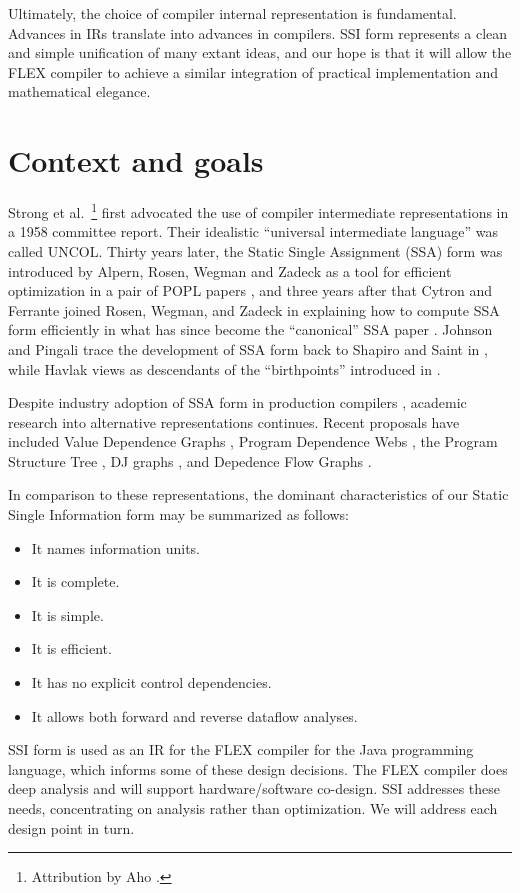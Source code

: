 \documentclass[12pt,titlepage,twoside]{article}
\let\oldsection\section
\renewcommand{\section}{\setcounter{figure}{0}\setcounter{table}{0}\oldsection}
\begin{document}
Ultimately, the choice of compiler internal representation is fundamental.
Advances in IRs translate into advances in compilers.  SSI form
represents a clean and simple unification of many extant ideas, and
our hope is that it will allow the FLEX compiler to achieve a similar
integration of practical implementation and mathematical elegance.

\section{Context and goals}
Strong et al.\ \cite{strong58}\footnote{Attribution by 
Aho \cite{aho88:dragon}.} first advocated the use of compiler
intermediate representations in a 1958 committee report.  Their
idealistic ``universal intermediate language'' was called UNCOL.
Thirty years later, the Static Single Assignment (SSA) form was
introduced by  Alpern, Rosen, Wegman and Zadeck
as a tool for efficient optimization in a pair of POPL
papers \cite{alpern88:ssa,rosen88:gvn}, and three years after that Cytron
and Ferrante joined Rosen, Wegman, and Zadeck in explaining how to
compute SSA form efficiently in what has since become the 
``canonical'' SSA paper \cite{cytron89:ssa}.  Johnson and Pingali
\cite{johnson93:dfg} trace the development of SSA form back to Shapiro
and Saint in \cite{shapiro70:ssa}, while Havlak \cite{havlak94:isa}
views  as descendants of the ``birthpoints'' introduced
in \cite{reif81:sym}.

Despite industry adoption of SSA form in production compilers
\cite{chow97:ssapre,chow96:hssa}, academic research into alternative
representations continues.
Recent proposals have included Value Dependence Graphs
\cite{weise94:vdg}, Program Dependence Webs \cite{ballance90:pdw},
the Program Structure Tree \cite{johnson94:pst},
DJ graphs \cite{sreedhar96:dj}, and Depedence Flow Graphs
\cite{johnson93:dfg}.

In comparison to these representations, the dominant characteristics of
our Static Single Information form may be summarized as follows:
\begin{itemize}
\item It names information units.
\item It is complete.
\item It is simple.
\item It is efficient.
\item It has no explicit control dependencies.
\item It allows both forward and reverse dataflow analyses.
\end{itemize}
SSI form is used as an IR for the FLEX compiler for the Java
programming language, which informs some of these design decisions.
The FLEX compiler does deep analysis and will support
hardware/software co-design.  SSI addresses these needs, concentrating
on analysis rather than optimization.  We will address each design
point in turn.
\end{document}
